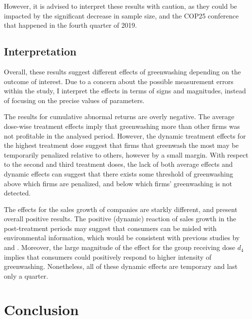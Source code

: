 \documentclass[12pt]{article}
\begin{document}
However, it is advised to interpret these results with caution, as they could be impacted by the significant decrease in sample size, and the COP25 conference that happened in the fourth quarter of 2019. 



\subsection{Interpretation}

Overall, these results suggest different effects of greenwashing depending on the outcome of interest. Due to a concern about the possible measurement errors within the study, I interpret the effects in terms of signs and magnitudes, instead of focusing on the precise values of parameters.

The results for cumulative abnormal returns are overly negative. The average dose-wise treatment effects imply that greenwashing more than other firms was not profitable in the analysed period. However, the dynamic treatment effects for the highest treatment dose suggest that firms that greenwash the most may be temporarily penalized relative to others, however by a small margin. With respect to the second and third treatment doses, the lack of both average effects and dynamic effects can suggest that there exists some threshold of greenwashing above which firms are penalized, and below which firms' greenwashing is not detected.

The effects for the sales growth of companies are starkly different, and present overall positive results. The positive (dynamic) reaction of sales growth in the post-treatment periods may suggest that consumers can be misled with environmental information, which would be consistent with previous studies by \citeauthor{schmuckMisleadingConsumersGreen2018} and \citeauthor{parguelCanEvokingNature2015}. Moreover, the large magnitude of the effect for the group receiving dose $d_4$ implies that consumers could positively respond to higher intensity of greenwashing. Nonetheless, all of these dynamic effects are temporary and last only a quarter.

\newpage
\section{Conclusion}\label{sect:discussion}
\end{document}
